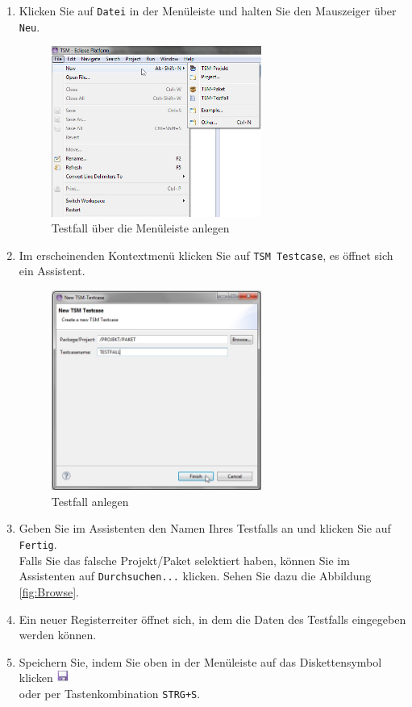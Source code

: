 \documentclass[11pt,a4paper,titlepage]{article}
\begin{document}
\begin{enumerate}
\item Klicken Sie auf \texttt{Datei} in der Menüleiste und halten Sie den Mauszeiger über \texttt{Neu}.

\begin{figure}[H]
\centering
\includegraphics[width= 260px]{BilderHandbuch/AnlegenM.png}
\caption{Testfall über die Menüleiste anlegen}
\label{fig:AnlegenM}
\end{figure}

\item Im erscheinenden Kontextmenü klicken Sie auf \texttt{TSM Testcase}, es öffnet sich ein Assistent.

\begin{figure}[H]
\centering
\includegraphics[width= 260px]{BilderHandbuch/Testfall/NewTestcase.png}
\caption{Testfall anlegen}
\label{fig:NewTestcase}
\end{figure}

\item Geben Sie im Assistenten den Namen Ihres Testfalls an und klicken Sie auf \texttt{Fertig}.\\
Falls Sie das falsche Projekt/Paket selektiert haben, können Sie im Assistenten auf \texttt{Durchsuchen...} klicken. Sehen Sie dazu die Abbildung \ref{fig:Browse}.
\item Ein neuer Registerreiter öffnet sich, in dem die Daten des Testfalls eingegeben werden können.
\item Speichern Sie, indem Sie oben in der Menüleiste auf das
Diskettensymbol klicken
\includegraphics[width= 15px]{BilderHandbuch/Testfall/Disk.png}
\\ oder per Tastenkombination \texttt{STRG+S}.

\end{enumerate}
\end{document}
